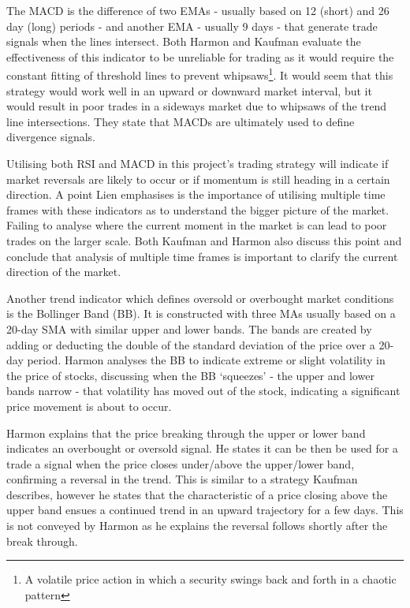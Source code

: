 The MACD is the difference of two EMAs - usually based on 12 (short) and 26 day (long) periods - and another EMA - usually 9 days - that generate trade signals when the lines intersect. Both Harmon \cite{BOOK:Harmon:2014} and Kaufman \cite{BOOK:Kaufman:2013} evaluate the effectiveness of this indicator to be unreliable for trading as it would require the constant fitting of threshold lines to prevent whipsaws\footnote{A volatile price action in which a security swings back and forth in a chaotic pattern}. It would seem that this strategy would work well in an upward or downward market interval, but it would result in poor trades in a sideways market due to whipsaws of the trend line intersections. They state that MACDs are ultimately used to define divergence signals.

Utilising both RSI and MACD in this project's trading strategy will indicate if market reversals are likely to occur or if momentum is still heading in a certain direction. A point Lien \cite{BOOK:Lien:2016} emphasises is the importance of utilising multiple time frames with these indicators as to understand the bigger picture of the market. Failing to analyse where the current moment in the market is can lead to poor trades on the larger scale. Both Kaufman \cite{BOOK:Kaufman:2013} and Harmon \cite{BOOK:Harmon:2014} also discuss this point and conclude that analysis of multiple time frames is important to clarify the current direction of the market.

Another trend indicator which defines oversold or overbought market conditions is the Bollinger Band (BB). It is constructed with three MAs usually based on a 20-day SMA with similar upper and lower bands. The bands are created by adding or deducting the double of the standard deviation of the price over a 20-day period.  Harmon \cite{BOOK:Harmon:2014} analyses the BB to indicate extreme or slight volatility in the price of stocks, discussing when the BB `squeezes' - the upper and lower bands narrow - that volatility has moved out of the stock, indicating a significant price movement is about to occur. 

Harmon \cite{BOOK:Harmon:2014} explains that the price breaking through the upper or lower band indicates an overbought or oversold signal. He states it can be then be used for a trade a signal when the price closes under/above the upper/lower band, confirming a reversal in the trend. This is similar to a strategy Kaufman \cite{BOOK:Kaufman:2013} describes, however he states that the characteristic of a price closing above the upper band ensues a continued trend in an upward trajectory for a few days. This is not conveyed by Harmon \cite{BOOK:Harmon:2014} as he explains the reversal follows shortly after the break through. 

